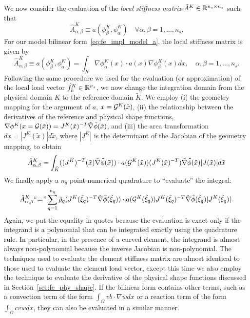 We now consider the evaluation of the \emph{local stiffness matrix} $\hat A^K \in \mathbb{R}^{n_s \times n_s}$ such that
\begin{equation*}
  \hat A^K_{\alpha,\beta} \equiv a(\phi^K_\beta,\phi^K_\alpha) \quad \forall \alpha,\beta = 1,\dots,n_s.
\end{equation*}
For our model bilinear form~\eqref{eq:fe_impl_model_a}, the local stiffness matrix is given by
\begin{equation*}
  \hat A^K_{\alpha,\beta}
  \equiv
  a(\phi^K_\beta,\phi^K_\alpha) = \int_K \nabla \phi^K_\alpha(x) \cdot a(x) \nabla \phi^K_\beta(x) dx , \quad \alpha,\beta = 1,\dots,n_s.
\end{equation*}
Following the same procedure we used for the evaluation (or approximation) of the local load vector $\hat f_h^K \in \mathbb{R}^{n_s}$, we now change the integration domain from the physical domain $K$ to the reference domain $\tilde K$.  We employ (i) the geometry mapping for the argument of $a$, $x = \mathcal{G}^K(\tilde x)$, (ii) the relationship between the derivatives of the reference and physical shape functions, $\nabla \phi^K(x = \mathcal{G}(\tilde x)) = J^K(\tilde x)^{-T} \tilde \nabla \tilde \phi(\tilde x)$, and (iii) the area transformation $dx = |J^K(\tilde x)| d \tilde x$, where $|J^K|$ is the determinant of the Jacobian of the geometry mapping, to obtain
\begin{equation}
  \hat A^K_{\alpha,\beta}
  =
  \int_{\tilde K} ((J^K)^{-T}(\tilde x) \tilde \nabla \tilde \phi(\tilde x))
  \cdot a(\mathcal{G}^K(\tilde x)) (J^K(\tilde x)^{-T}) \tilde \nabla \tilde \phi(\tilde x)
  |J(\tilde x)| d\tilde x
  \label{eq:fe_impl_loc_mat_2}
\end{equation}
We finally apply a $n_q$-point numerical quadrature to ``evaluate'' the integral:
\begin{equation*}
  \hat A^K_{\alpha,\beta}
  \text{``}\hspace{-0.2em}=\hspace{-0.2em}\text{''}
  \sum_{q=1}^{n_q} \tilde \rho_q
   (J^K(\tilde \xi_q)^{-T} \tilde \nabla \tilde \phi(\tilde \xi_q))
  \cdot a(\mathcal{G}^K(\tilde \xi_q)) J^K(\tilde \xi_q)^{-T} \tilde \nabla \tilde \phi(\tilde \xi_q)
  |J^K(\tilde \xi_q)|.
\end{equation*}
Again, we put the equality in quotes because the evaluation is exact only if the integrand is a polynomial that can be integrated exactly using the quadrature rule.  In particular, in the presence of a curved element, the integrand is almost always non-polynomial because the inverse Jacobian is non-polynomial. The techniques used to evaluate the element stiffness matrix are almost identical to those used to evaluate the element load vector, except this time we also employ the technique to evaluate the derivative of the physical shape functions discussed in Section~\ref{sec:fe_phy_shape}. If the bilinear form contains other terms, such as a convection term of the form $\int_{\Omega} v b \cdot \nabla w dx$ or a reaction term of the form $\int_\Omega c v w dx$, they can also be evaluated in a similar manner.


